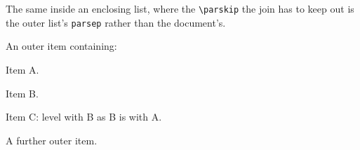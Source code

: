 \documentclass{article}
\begin{document}
The same inside an enclosing list, where the \verb|\parskip| the join has to
keep out is the outer list's \verb|parsep| rather than the document's.

\begin{prop}
  \item An outer item containing:
  \begin{prop}\item Item A.\item Item B.\end{prop}
  \begin{prop}\item Item C: level with B as B is with A.\end{prop}
  \item A further outer item.
\end{prop}
\end{document}

